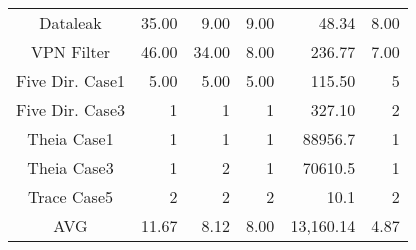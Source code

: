 \begin{table}[t]
{\begin{tabular}{crrrrr}
Dataleak                   & 35.00                                    & 9.00                                           & 9.00                                     & 48.34                                    & 8.00                                 \\
VPN Filter                 & 46.00                                    & 34.00                                          & 8.00                                     & 236.77                                   & 7.00                                 \\
Five Dir. Case1            & 5.00                                     & 5.00                                           & 5.00                                     & 115.50                                   & 5                                    \\
Five Dir. Case3            & 1                                        & 1                                              & 1                                        & 327.10                                   & 2                                    \\
Theia Case1                & 1                                        & 1                                              & 1                                        & 88956.7                                  & 1                                    \\
Theia Case3                & 1                                        & 2                                              & 1                                        & 70610.5                                  & 1                                    \\
Trace Case5                & 2                                        & 2                                              & 2                                        & 10.1                                     & 2                                    \\
AVG                        & 11.67                                    & 8.12                                           & 8.00                                     & 13,160.14                                & 4.87                                 \\ \hline
\end{tabular}
}
\end{table}